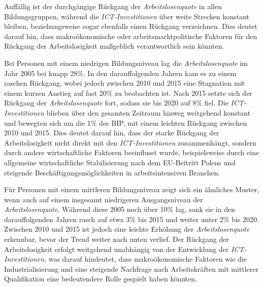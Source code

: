 Auffällig ist der durchgängige Rückgang der \textit{Arbeitslosenquote} in allen 
Bildungsgruppen, während die \textit{\ac{ICT}-Investitionen} über weite Strecken 
konstant bleiben, beziehungsweise sogar ebenfalls einen Rückgang verzeichnen. Dies 
deutet darauf hin, dass makroökonomische oder arbeitsmarktpolitische Faktoren für 
den Rückgang der Arbeitslosigkeit maßgeblich verantwortlich sein könnten.

Bei Personen mit einem niedrigen Bildungsniveau lag die \textit{Arbeitslosenquote} im 
Jahr 2005 bei knapp 28\%. In den darauffolgenden Jahren kam es zu einem raschen Rückgang, 
wobei jedoch zwischen 2010 und 2015 eine Stagnation mit einem kurzen Anstieg auf fast 
20\% zu beobachten ist. Nach 2015 setzte sich der Rückgang der \textit{Arbeitslosenquote}  
fort, sodass sie bis 2020 auf 8\% fiel. Die \textit{\ac{ICT}-Investitionen} blieben 
über den gesamten Zeitraum hinweg weitgehend konstant und bewegten sich um die 1\% des 
BIP, mit einem leichten Rückgang zwischen 2010 und 2015. Dies deutet darauf hin, dass  
der starke Rückgang der Arbeitslosigkeit nicht direkt mit den 
\textit{\ac{ICT}-Investitionen} zusammenhängt, sondern durch andere wirtschaftliche 
Faktoren beeinflusst wurde, beispielsweise durch eine allgemeine wirtschaftliche 
Stabilisierung nach dem EU-Beitritt Polens und steigende Beschäftigungsmöglichkeiten 
in arbeitsintensiven Branchen.

Für Personen mit einem mittleren Bildungsniveau zeigt sich ein ähnliches Muster, wenn 
auch auf einem insgesamt niedrigeren Ausgangsniveau der \textit{Arbeitslosenquote}. 
Während diese 2005 noch über 10\% lag, sank sie in den darauffolgenden Jahren rasch auf 
etwa 3\% bis 2015 und weiter unter 2\% bis 2020. Zwischen 2010 und 2015 ist jedoch eine 
leichte Erhöhung der \textit{Arbeitslosenquote} erkennbar, bevor der Trend weiter nach 
unten verlief. Der Rückgang der Arbeitslosigkeit erfolgt weitgehend unabhängig von der 
Entwicklung der \textit{\ac{ICT}-Investitionen}, was darauf hindeutet, dass 
makroökonomische Faktoren wie die Industrialisierung und eine steigende Nachfrage 
nach Arbeitskräften mit mittlerer Qualifikation eine bedeutendere Rolle gespielt 
haben könnten.

